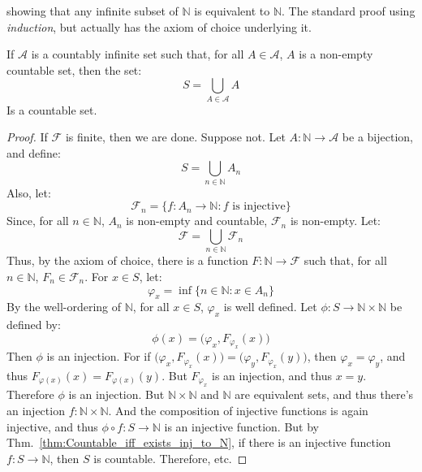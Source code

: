     showing that any infinite subset of $\mathbb{N}$ is
    equivalent to $\mathbb{N}$. The standard proof
    using \textit{induction}, but actually has the axiom
    of choice underlying it.
    \begin{theorem}
        If $\mathcal{A}$ is a countably infinite set
        such that, for all $A\in\mathcal{A}$, $A$ is
        a non-empty countable set, then the set:
        \begin{equation}
            S=\bigcup_{A\in\mathcal{A}}A
        \end{equation}
        Is a countable set.
    \end{theorem}
    \begin{proof}
        If $\mathcal{F}$ is finite, then we are done. Suppose not.
        Let $A:\mathbb{N}\rightarrow\mathcal{A}$ be a bijection,
        and define:
        \begin{equation}
            S=\bigcup_{n\in\mathbb{N}}A_{n}
        \end{equation}
        Also, let:
        \begin{equation}
            \mathcal{F}_{n}
            =\{f:A_{n}\rightarrow\mathbb{N}:
                f\textrm{ is injective}\}
        \end{equation}
        Since, for all $n\in\mathbb{N}$, $A_{n}$ is
        non-empty and countable, $\mathcal{F}_{n}$
        is non-empty. Let:
        \begin{equation}
            \mathcal{F}
            =\bigcup_{n\in\mathbb{N}}\mathcal{F}_{n}
        \end{equation}
        Thus, by the axiom of choice, there is a function
        $F:\mathbb{N}\rightarrow\mathcal{F}$ such that, for all
        $n\in\mathbb{N}$, $F_{n}\in\mathcal{F}_{n}$. For
        $x\in{S}$, let:
        \begin{equation}
            \varphi_{x}
            =\inf\{n\in\mathbb{N}:x\in{A}_{n}\}
        \end{equation}
        By the well-ordering of $\mathbb{N}$, for all
        $x\in{S}$, $\varphi_{x}$ is well defined. Let
        $\phi:S\rightarrow\mathbb{N}\times\mathbb{N}$
        be defined by:
        \begin{equation}
            \phi(x)
            =\big(\varphi_{x},F_{\varphi_{x}}(x)\big)
        \end{equation}
        Then $\phi$ is an injection. For if
        $\big(\varphi_{x},F_{\varphi_{x}}(x)\big)=%
         \big(\varphi_{y},F_{\varphi_{x}}(y)\big)$, then
        $\varphi_{x}=\varphi_{y}$, and thus
        $F_{\varphi(x)}(x)=F_{\varphi(x)}(y)$. But
        $F_{\varphi_{x}}$ is an injection, and
        thus $x=y$. Therefore $\phi$ is an injection.
        But $\mathbb{N}\times\mathbb{N}$ and $\mathbb{N}$
        are equivalent sets, and thus there's an
        injection $f:\mathbb{N}\times\mathbb{N}$. And
        the composition of injective functions is again
        injective, and thus
        $\phi\circ{f}:S\rightarrow\mathbb{N}$ is an
        injective function. But by
        Thm.~\ref{thm:Countable_iff_exists_inj_to_N},
        if there is an injective function
        $f:S\rightarrow\mathbb{N}$, then $S$ is
        countable. Therefore, etc.
    \end{proof}
